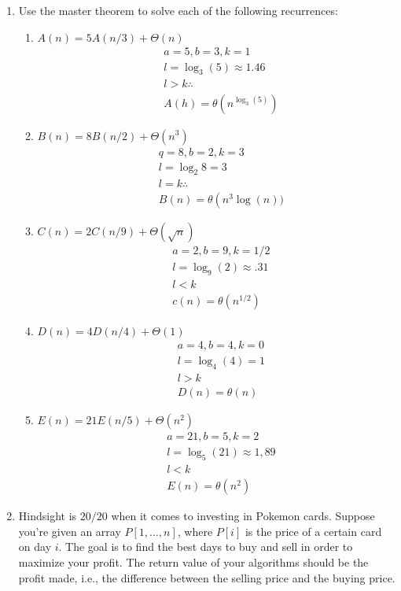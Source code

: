 \documentclass[11pt]{article}
\theoremstyle{definition}  %
\begin{document}
\begin{enumerate}
  \item
  Use the master theorem to solve each of the following recurrences:
  \begin{enumerate}
    \item  $A(n)=5 A(n / 3)+\Theta(n)$
    \begin{align*}
      &a=5, b=3, k=1 \\
      &l=\log _3(5) \approx 1.46 \\
      &l>k \therefore \\
      &A(h)=\theta\left(n^{\log _3(5)}\right)
    \end{align*}
    \item  $B(n)=8 B(n / 2)+\Theta\left(n^3\right)$
    \begin{align*}
    &q=8, b=2, k=3 \\
    &l=\log _2 8=3 \\
    &l=k \therefore\\ &B(n)=\theta\left(n^3 \log (n))\right.
    \end{align*}
    \item  $C(n)=2 C(n / 9)+\Theta(\sqrt{n})$
    \begin{align*}
    &a=2, b=9, k=1 / 2 \\
    &l=\log _9(2) \approx .31 \\
    &l<k \\
    &c(n)=\theta\left(n^{1 / 2}\right)
    \end{align*}
    \item  $D(n)=4 D(n / 4)+\Theta(1)$
    \begin{align*}
    &a=4, b=4, k=0 \\
    &l=\log _4(4)=1 \\
    &l>k \\
    &D(n)=\theta(n)
    \end{align*}
      \item $E(n)=21 E(n / 5)+\Theta\left(n^2\right)$
      \begin{align*}
      &a=21, b=5, k=2 \\
      &l=\log _5(21) \approx 1,89 \\
      &l<k \\
      &E(n)=\theta\left(n^2\right)
      \end{align*}
  \end{enumerate}

  \item
  Hindsight is $20 / 20$ when it comes to investing in Pokemon cards. Suppose you're given an array $P[1, \ldots, n]$, where $P[i]$ is the price of a certain card on day $i$. The goal is to find the best days to buy and sell in order to maximize your profit. The return value of your algorithms should be the profit made, i.e., the difference between the selling price and the buying price.


\end{enumerate}
\end{document}
